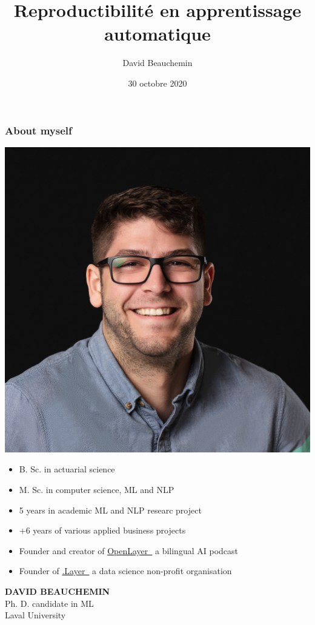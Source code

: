 \documentclass[aspectratio=169,10pt,xcolor=x11names,english,french]{beamer}
\title{Reproductibilité en apprentissage automatique}
\author{David Beauchemin}
\date{30 octobre 2020}
\newcommand{\link}[2]{\href{#1}{#2~{\smaller\faExternalLink*}}}
\newcounter{frame}[frame]
\begin{document}
	
	
	
	
	\begin{frame}
		\frametitle{About myself}
		
		\begin{minipage}{0.25\linewidth}
			\includegraphics[width=\linewidth,keepaspectratio]{img/david}
		\end{minipage}
		\hfill
		\begin{minipage}{0.70\linewidth}
			\begin{itemize}
				\item B. Sc. in actuarial science
				\item M. Sc. in computer science, ML and NLP
				\item 5 years in academic ML and NLP researc project
				\item +6 years of various applied business projects
				\item Founder and creator of \link{https://anchor.fm/open-layer}{OpenLayer} a bilingual AI podcast
				\item Founder of \link{https://www.dotlayer.org/}{.Layer} a data science non-profit organisation
			\end{itemize}
		\end{minipage}
		
		\begin{minipage}{0.25\linewidth}
			\small
			\textbf{DAVID BEAUCHEMIN} \\
			Ph. D. candidate in ML\\
			\footnotesize Laval University
		\end{minipage}
	\end{frame}
\end{document}
